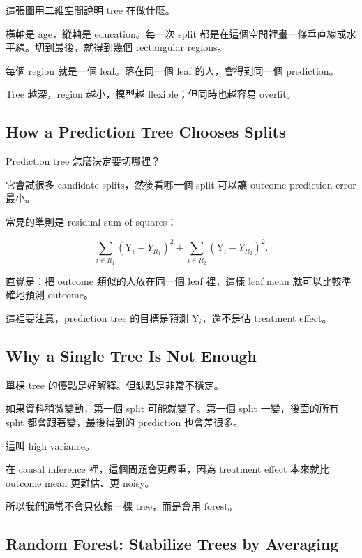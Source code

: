 \documentclass[
  chinese,
  11pt,
]{article}
\begin{document}
這張圖用二維空間說明 tree 在做什麼。

橫軸是 age，縱軸是 education。每一次 split
都是在這個空間裡畫一條垂直線或水平線。切到最後，就得到幾個 rectangular
regions。

每個 region 就是一個 leaf。落在同一個 leaf 的人，會得到同一個
prediction。

Tree 越深，region 越小，模型越 flexible；但同時也越容易 overfit。

\subsection{How a Prediction Tree Chooses
Splits}\label{how-a-prediction-tree-chooses-splits}

Prediction tree 怎麼決定要切哪裡？

它會試很多 candidate splits，然後看哪一個 split 可以讓 outcome
prediction error 最小。

常見的準則是 residual sum of squares：

\[
\sum_{i\in R_1}\left(\mathrm{Y}_i-\bar{Y}_{R_1}\right)^2
+
\sum_{i\in R_2}\left(\mathrm{Y}_i-\bar{Y}_{R_2}\right)^2.
\]

直覺是：把 outcome 類似的人放在同一個 leaf 裡，這樣 leaf mean
就可以比較準確地預測 outcome。

這裡要注意，prediction tree 的目標是預測 \(\mathrm{Y}_i\)，還不是估
treatment effect。

\subsection{Why a Single Tree Is Not
Enough}\label{why-a-single-tree-is-not-enough}

單棵 tree 的優點是好解釋。但缺點是非常不穩定。

如果資料稍微變動，第一個 split 可能就變了。第一個 split 一變，後面的所有
split 都會跟著變，最後得到的 prediction 也會差很多。

這叫 high variance。

在 causal inference 裡，這個問題會更嚴重，因為 treatment effect 本來就比
outcome mean 更難估、更 noisy。

所以我們通常不會只依賴一棵 tree，而是會用 forest。

\subsection{Random Forest: Stabilize Trees by
Averaging}\label{random-forest-stabilize-trees-by-averaging}
\end{document}
